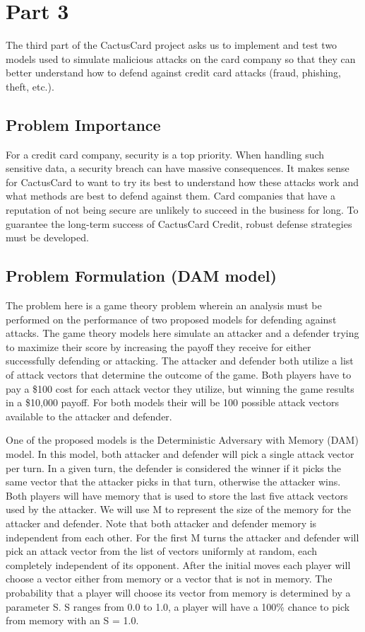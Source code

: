 \documentclass[11pt,journal]{IEEEtran}
\begin{document}
\section{Part 3} \label{part3}
The third part of the CactusCard project asks us to implement and test two models used to simulate malicious attacks on the card company so that they can better understand how to defend against credit card attacks (fraud, phishing, theft, etc.).

\subsection{Problem Importance}
For a credit card company, security is a top priority. When handling such sensitive data, a security breach can have massive consequences. It makes sense for CactusCard to want to try its best to understand how these attacks work and what methods are best to defend against them. Card companies that have a reputation of not being secure are unlikely to succeed in the business for long. To guarantee the long-term success of CactusCard Credit, robust defense strategies must be developed. 

\subsection{Problem Formulation (DAM model)}
The problem here is a game theory problem wherein an analysis must be performed on the performance of two proposed models for defending against attacks. The game theory models here simulate an attacker and a defender trying to maximize their score by increasing the payoff they receive for either successfully defending or attacking. The attacker and defender both utilize a list of attack vectors that determine the outcome of the game. Both players have to pay a \$100 cost for each attack vector they utilize, but winning the game results in a \$10,000 payoff. For both models their will be 100 possible attack vectors available to the attacker and defender.
\par
One of the proposed models is the Deterministic Adversary with Memory (DAM) model. In this model, both attacker and defender will pick a single attack vector per turn. In a given turn, the defender is considered the winner if it picks the same vector that the attacker picks in that turn, otherwise the attacker wins. Both players will have memory that is used to store the last five attack vectors used by the attacker. We will use M to represent the size of the memory for the attacker and defender. Note that both attacker and defender memory is independent from each other. For the first M turns the attacker and defender will pick an attack vector from the list of vectors uniformly at random, each completely independent of its opponent. After the initial moves each player will choose a vector either from memory or a vector that is not in memory. The probability that a player will choose its vector from memory is determined by a parameter S. S ranges from 0.0 to 1.0, a player will have a 100\% chance to pick from memory with an S = 1.0.
\end{document}
